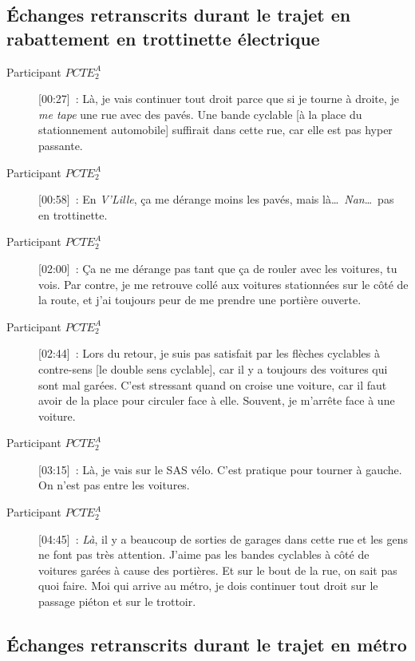 \subsection{Échanges retranscrits durant le trajet en rabattement en trottinette électrique}

\begin{description}
    \item[Participant \(PCTE^{A}_{2}\)] [00:27]~: Là, je vais continuer tout droit parce que si je tourne à droite, je \textsl{me tape} une rue avec des pavés. Une bande cyclable [à la place du stationnement automobile] suffirait dans cette rue, car elle est pas hyper passante.
    \item[Participant \(PCTE^{A}_{2}\)] [00:58]~: En \textsl{V'Lille}, ça me dérange moins les pavés, mais là\dots~\textsl{Nan}\dots~pas en trottinette.
    \item[Participant \(PCTE^{A}_{2}\)] [02:00]~: Ça ne me dérange pas tant que ça de rouler avec les voitures, tu vois. Par contre, je me retrouve collé aux voitures stationnées sur le côté de la route, et j'ai toujours peur de me prendre une portière ouverte.
    \item[Participant \(PCTE^{A}_{2}\)] [02:44]~: Lors du retour, je suis pas satisfait par les flèches cyclables à contre-sens [le double sens cyclable], car il y a toujours des voitures qui sont mal garées. C'est stressant quand on croise une voiture, car il faut avoir de la place pour circuler face à elle. Souvent, je m'arrête face à une voiture.
    \item[Participant \(PCTE^{A}_{2}\)] [03:15]~: Là, je vais sur le SAS vélo. C'est pratique pour tourner à gauche. On n'est pas entre les voitures.
    \item[Participant \(PCTE^{A}_{2}\)] [04:45]~: \textsl{Là}, il y a beaucoup de sorties de garages dans cette rue et les gens ne font pas très attention. J'aime pas les bandes cyclables à côté de voitures garées à cause des portières. Et sur le bout de la rue, on sait pas quoi faire. Moi qui arrive au métro, je dois continuer tout droit sur le passage piéton et sur le trottoir.%
\end{description}

\subsection{Échanges retranscrits durant le trajet en métro}

